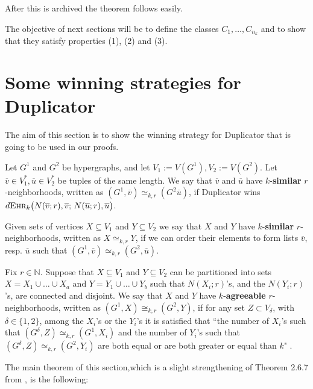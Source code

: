 \documentclass[12pt,notitlepage,a4paper]{article}
\theoremstyle{definition}
\newcommand{\N}{\mathbb{N}}
\newcommand{\ehr}{\textsc{Ehr}}
\begin{document}
After this is archived the theorem follows easily. 

The objective of next sections will be to define the classes 
$C_1,\dots, C_{n_k}$ and to show that they satisfy properties (1), (2) and (3).


\section{Some winning strategies for Duplicator}

The aim of this section is to show the winning strategy
for Duplicator that is going to be used in our proofs. \par

Let $G^1$ and $G^2$ be hypergraphs, and let
$V_1:=V(G^1), V_2:=V(G^2)$.
Let $\overline{v} \in V_1^*, 
\overline{u} \in V_2^*$ be tuples of the same length.
We say that $\overline{v}$ and $\overline{u}$ have
$k$-\textbf{similar} $r$-neighborhoods, written as
$(G^1,\overline{v})\simeq_{k,r}(G^2 \overline{u})$, if Duplicator wins
$d\ehr_k\big(N(\overline{v};r),
\overline{v};\, N(\overline{u};r),\overline{u}\big)$.\par
Given sets of vertices $X\subseteq V_1$ and $Y\subseteq V_2$
we say that $X$ and $Y$ have $k$-\textbf{similar}
$r$-neighborhoods, written as
$X\simeq_{k,r} Y$, if we can order their elements to form
lists $\overline{v}$, resp. $\overline{u}$ such that 
$(G^1,\overline{v})\simeq_{k,r}(G^2,\overline{u})$.
\par
Fix $r\in \N$. Suppose that $X\subseteq V_1$ and 
$Y\subseteq V_2$ can
be partitioned into sets $X=X_1\cup \dots \cup X_a$
and $Y=Y_1\cup \dots \cup Y_b$ 
such that $N(X_i;r)$'s, and the
$N(Y_i;r)$'s, are connected and disjoint. 
We say that $X$ and
$Y$ have $k$-\textbf{agreeable} $r$-neighborhoods,
written as $(G^1,X)\cong_{k,r} (G^2,Y)$, 
if for any set $Z\subset V_\delta$, with $\delta\in \{1,2\}$,
among the $X_i$'s or the $Y_i$'s
it is satisfied that ``the number of $X_i$'s  
such that $(G^\delta, Z) \simeq_{k,r} (G^1,X_i)$ 
and the number of $Y_i$'s such that
$(G^\delta,Z)\simeq_{k,r} (G^2,Y_i)$
are both equal or are both greater 
or equal than $k$" .

The main theorem of this section,which
is a slight strengthening of Theorem 
2.6.7 from \cite{spencer2013strange}, is the following:
\end{document}
